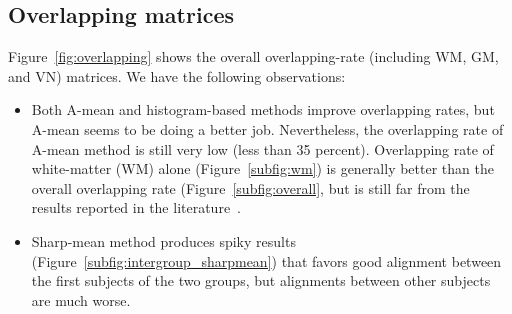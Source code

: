 \documentclass[preprint,review,12pt]{elsarticle}
\begin{document}
\subsection{Overlapping matrices}



Figure~\ref{fig:overlapping} shows the overall overlapping-rate (including WM, GM, and VN) matrices. We have the following observations:
\begin{itemize}
	\item Both A-mean and histogram-based methods improve overlapping rates, but A-mean seems to be doing a better job. Nevertheless, the overlapping rate of A-mean method is still very low (less than 35 percent). Overlapping rate of white-matter (WM) alone (Figure~\ref{subfig:wm}) is generally better than the overall overlapping rate (Figure~\ref{subfig:overall}, but is still far from the results reported in the literature~\cite{Wu20111968}.
	\item Sharp-mean method produces spiky results (Figure~\ref{subfig:intergroup_sharpmean}) that favors good alignment between the first subjects of the two groups, but alignments between other subjects are much worse.
\end{itemize}
\end{document}

